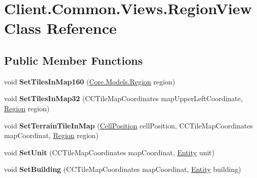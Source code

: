 \hypertarget{classClient_1_1Common_1_1Views_1_1RegionView}{\section{Client.\-Common.\-Views.\-Region\-View Class Reference}
\label{classClient_1_1Common_1_1Views_1_1RegionView}
}
\subsection*{Public Member Functions}
\begin{DoxyCompactItemize}
\item 
\hypertarget{classClient_1_1Common_1_1Views_1_1RegionView_a0cdbb71882873cd2a1ca175de99c6758}{void {\bfseries Set\-Tiles\-In\-Map160} (\hyperlink{classCore_1_1Models_1_1Region}{Core.\-Models.\-Region} region)}\label{classClient_1_1Common_1_1Views_1_1RegionView_a0cdbb71882873cd2a1ca175de99c6758}

\item 
\hypertarget{classClient_1_1Common_1_1Views_1_1RegionView_a078de04047a3197ea046273066ca1908}{void {\bfseries Set\-Tiles\-In\-Map32} (C\-C\-Tile\-Map\-Coordinates map\-Upper\-Left\-Coordinate, \hyperlink{classCore_1_1Models_1_1Region}{Region} region)}\label{classClient_1_1Common_1_1Views_1_1RegionView_a078de04047a3197ea046273066ca1908}

\item 
\hypertarget{classClient_1_1Common_1_1Views_1_1RegionView_ab2109ac4f5057767a68c56f3da790e63}{void {\bfseries Set\-Terrain\-Tile\-In\-Map} (\hyperlink{classCore_1_1Models_1_1CellPosition}{Cell\-Position} cell\-Position, C\-C\-Tile\-Map\-Coordinates map\-Coordinat, \hyperlink{classCore_1_1Models_1_1Region}{Region} region)}\label{classClient_1_1Common_1_1Views_1_1RegionView_ab2109ac4f5057767a68c56f3da790e63}

\item 
\hypertarget{classClient_1_1Common_1_1Views_1_1RegionView_a181652ed5a19e54acd5e0dcef3874474}{void {\bfseries Set\-Unit} (C\-C\-Tile\-Map\-Coordinates map\-Coordinat, \hyperlink{classCore_1_1Models_1_1Entity}{Entity} unit)}\label{classClient_1_1Common_1_1Views_1_1RegionView_a181652ed5a19e54acd5e0dcef3874474}

\item 
\hypertarget{classClient_1_1Common_1_1Views_1_1RegionView_a0e9d268a4380f2e1c9814216e0e950d0}{void {\bfseries Set\-Building} (C\-C\-Tile\-Map\-Coordinates map\-Coordinat, \hyperlink{classCore_1_1Models_1_1Entity}{Entity} building)}\label{classClient_1_1Common_1_1Views_1_1RegionView_a0e9d268a4380f2e1c9814216e0e950d0}


\end{DoxyCompactItemize}
